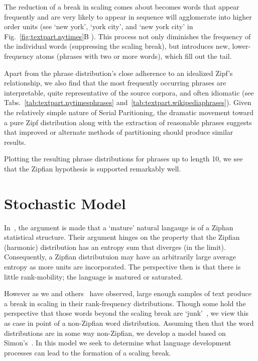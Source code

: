 The reduction of a break in scaling comes about 
becomes words that appear frequently and are very likely to appear in sequence
will agglomerate into higher order units (see `new york', `york city', and
`new york city' in Fig.~\ref{fig:textpart.nytimes}B ). 
This process not only diminishes the frequency of the individual words
(suppressing the scaling break), but introduces new, lower-frequency
atoms (phrases with two or more words),
which fill out the tail.


Apart from the phrase distribution's close adherence to an idealized Zipf's
relationship, we also find that the most frequently occurring phrases are
interpretable, quite representative of the source corpora, and often
idiomatic (see Tabs.~\ref{tab:textpart.nytimesphrases} and~\ref{tab:textpart.wikipediaphrases}).
Given the relatively simple nature of Serial Paritioning,
the dramatic movement toward a pure Zipf distribution along with the extraction
of reasonable phrases suggests that improved or alternate methods of
partitioning should produce similar results.



Plotting the resulting phrase distributions for phrases up to length
10, we see that the Zipfian
hypothesis is supported remarkably well.



\section{Stochastic Model}
\label{sec:textpart.model}



In~\cite{araujo2013}, the argument is made that a `mature' natural
langauge is of a Ziphan statistical structure.
Their argument hinges on the property that the Zipfian (harmonic)
distribution has an entropy sum that diverges (in the limit).
Consequently, a Zipfian distributuion may have an arbitrarily large
average entropy as more units are incorporated.
The perspective then is that there is little rank-mobility; the
language is matured or saturated.

However as we and others~\cite{ha2009a,gerlach2013a} have observed, large
enough samples of text produce a break in scaling in their rank-frequency
distributions.
Though some hold the perspective that those words beyond the scaling break are
`junk'~\cite{???}, we view this as case in point of a
non-Zipfian word distribution.
Assuming then that the word distributions are in some way non-Zipfian,
we develop a model based on Simon's~\cite{simon1955a}.
In this model we seek to determine what language development processes
can lead to the formation of a scaling break.

